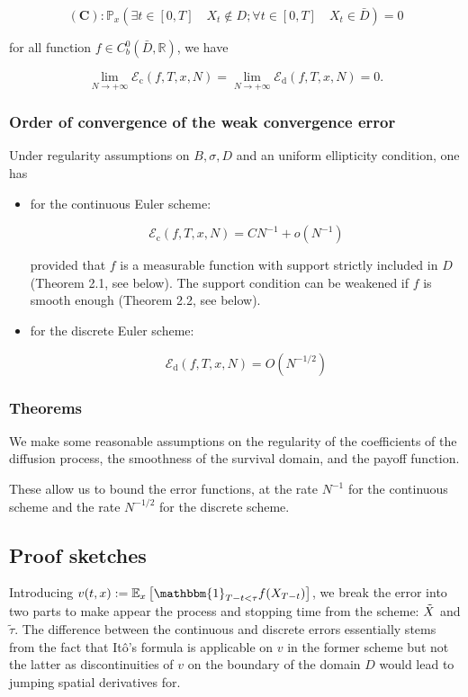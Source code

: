 $$
\mathbf{( C )}: \mathbb{P}_{x}\left(\exists t \in[0, T] \quad X_{t} \notin D ; \forall t \in[0, T] \quad X_{t} \in \bar{D}\right)=0
$$

for all function $f \in C_{b}^{0}(\bar{D}, \mathbb{R})$, we have

$$
\lim _{N \rightarrow+\infty} \mathcal{E}_{\mathrm{c}}(f, T, x, N)=\lim _{N \rightarrow+\infty} \mathcal{E}_{\mathrm{d}}(f, T, x, N)=0 .
$$


\subsubsection{Order of convergence of the weak convergence error}

Under regularity assumptions on $B, \sigma, D$ and an uniform ellipticity condition, one has

\begin{itemize}
    \item for the continuous Euler scheme:

$$
\mathcal{E}_{\mathrm{c}}(f, T, x, N)=C N^{-1}+o\left(N^{-1}\right)
$$

provided that $f$ is a measurable function with support strictly included in $D$ (Theorem 2.1, see below). The support condition can be weakened if $f$ is smooth enough (Theorem 2.2, see below).

    \item for the discrete Euler scheme:

$$
\mathcal{E}_{\mathrm{d}}(f, T, x, N)=O\left(N^{-1 / 2}\right)
$$
\end{itemize}

\subsubsection{Theorems}

We make some reasonable assumptions on the regularity of the coefficients of the diffusion process, the smoothness of the survival domain, and the payoff function.

These allow us to bound the error functions, at the rate $N^{-1}$ for the continuous scheme and the rate $N^{-1/2}$ for the discrete scheme.

\subsection{Proof sketches}

Introducing $v(t,x):=\mathbb{E}_{x}\left[\mathbbm{1}_{T-t<\tau} f(X_{T-t})\right]$, we break the error into two parts to make appear the process and stopping time from the scheme: $\Tilde{X}$ and $\tilde{\tau}$. The difference between the continuous and discrete errors essentially stems from the fact that Itô's formula is applicable on $v$ in the former scheme but not the latter as discontinuities of $v$ on the boundary of the domain $D$ would lead to jumping spatial derivatives for.\\


